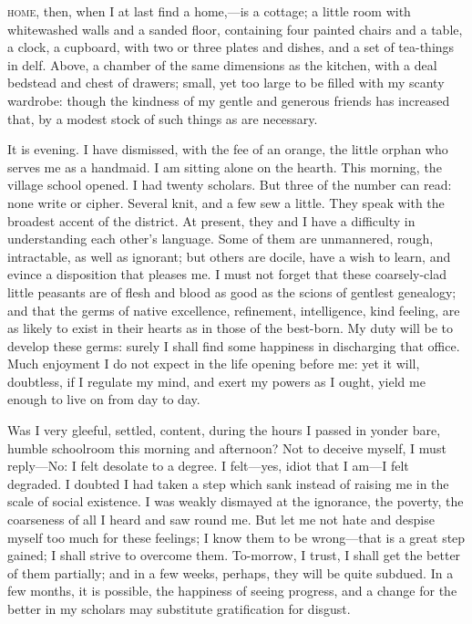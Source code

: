 
 \textsc{home,} then, when I at last find a home,---is a cottage; a little room
with whitewashed walls and a sanded floor, containing four painted
chairs and a table, a clock, a cupboard, with two or three plates and
dishes, and a set of tea-things in delf. Above, a chamber of the same
dimensions as the kitchen, with a deal bedstead and chest of drawers;
small, yet too large to be filled with my scanty wardrobe: though the
kindness of my gentle and generous friends has increased that, by a
modest stock of such things as are necessary.

It is evening. I have dismissed, with the fee of an orange, the little
orphan who serves me as a handmaid. I am sitting alone on the hearth. 
This morning, the village school opened. I had twenty scholars. But
three of the number can read: none write or cipher. Several knit, and a
few sew a little. They speak with the broadest accent of the district. 
At present, they and I have a difficulty in understanding each other's
language. Some of them are unmannered, rough, intractable, as well as
ignorant; but others are docile, have a wish to learn, and evince a
disposition that pleases me. I must not forget that these coarsely-clad
little peasants are of flesh and blood as good as the scions of gentlest
genealogy; and that the germs of native excellence, refinement,
intelligence, kind feeling, are as likely to exist in their hearts as in
those of the best-born. My duty will be to develop these germs: surely
I shall find some happiness in discharging that office. Much enjoyment
I do not expect in the life opening before me: yet it will, doubtless,
if I regulate my mind, and exert my powers as I ought, yield me enough
to live on from day to day.

Was I very gleeful, settled, content, during the hours I passed in
yonder bare, humble schoolroom this morning and afternoon? Not to
deceive myself, I must reply---No: I felt desolate to a degree. I
felt---yes, idiot that I am---I felt degraded. I doubted I had taken a
step which sank instead of raising me in the scale of social existence. 
I was weakly dismayed at the ignorance, the poverty, the coarseness of
all I heard and saw round me. But let me not hate and despise myself
too much for these feelings; I know them to be wrong---that is a great
step gained; I shall strive to overcome them. To-morrow, I trust, I
shall get the better of them partially; and in a few weeks, perhaps,
they will be quite subdued. In a few months, it is possible, the
happiness of seeing progress, and a change for the better in my scholars
may substitute gratification for disgust.

